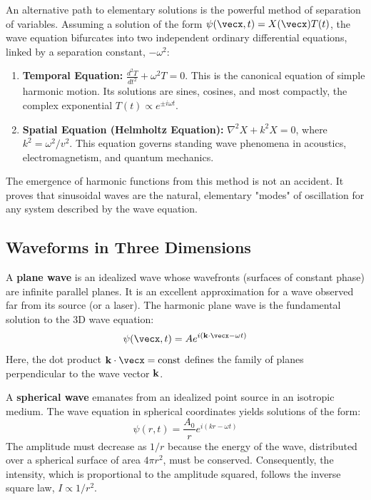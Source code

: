 \begin{proposition}
An alternative path to elementary solutions is the powerful method of separation of variables. Assuming a solution of the form $\psi(\vecx, t) = X(\vecx)T(t)$, the wave equation bifurcates into two independent ordinary differential equations, linked by a separation constant, $-\omega^2$:
\begin{enumerate}
    \item \textbf{Temporal Equation:} $\frac{d^2T}{dt^2} + \omega^2 T = 0$. This is the canonical equation of simple harmonic motion. Its solutions are sines, cosines, and most compactly, the complex exponential $T(t) \propto e^{\pm i\omega t}$.
    \item \textbf{Spatial Equation (Helmholtz Equation):} $\nabla^2 X + k^2 X = 0$, where $k^2 = \omega^2/v^2$. This equation governs standing wave phenomena in acoustics, electromagnetism, and quantum mechanics.
\end{enumerate}
The emergence of harmonic functions from this method is not an accident. It proves that sinusoidal waves are the natural, elementary "modes" of oscillation for any system described by the wave equation.
\end{proposition}

\subsection{Waveforms in Three Dimensions}

\begin{definition}
A \textbf{plane wave} is an idealized wave whose wavefronts (surfaces of constant phase) are infinite parallel planes. It is an excellent approximation for a wave observed far from its source (or a laser). The harmonic plane wave is the fundamental solution to the 3D wave equation:
$$ \psi(\vecx, t) = A e^{i(\vecbf{k} \cdot \vecx - \omega t)} $$
Here, the dot product $\vecbf{k} \cdot \vecx = \text{const}$ defines the family of planes perpendicular to the wave vector $\mathbf{k}$.
\end{definition}

\begin{definition}
A \textbf{spherical wave} emanates from an idealized point source in an isotropic medium. The wave equation in spherical coordinates yields solutions of the form:
$$ \psi(r, t) = \frac{A_0}{r} e^{i(kr - \omega t)} $$
The amplitude must decrease as $1/r$ because the energy of the wave, distributed over a spherical surface of area $4\pi r^2$, must be conserved. Consequently, the intensity, which is proportional to the amplitude squared, follows the inverse square law, $I \propto 1/r^2$.
\end{definition}

